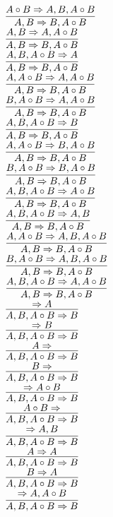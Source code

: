 \documentclass[11pt]{article}
\begin{document}
\begin{center}
\bigskip
\\$\infer{A, B\Rightarrow B, A\circ B}{A\circ B\Rightarrow A, B, A\circ B}$
\bigskip
\\$\infer{A, B\Rightarrow B, A\circ B}{A, B\Rightarrow A, A\circ B}$
\bigskip
\\$\infer{A, B\Rightarrow B, A\circ B}{A, B, A\circ B\Rightarrow A}$
\bigskip
\\$\infer{A, B\Rightarrow B, A\circ B}{A, A\circ B\Rightarrow A, A\circ B}$
\bigskip
\\$\infer{A, B\Rightarrow B, A\circ B}{B, A\circ B\Rightarrow A, A\circ B}$
\bigskip
\\$\infer{A, B\Rightarrow B, A\circ B}{A, B, A\circ B\Rightarrow B}$
\bigskip
\\$\infer{A, B\Rightarrow B, A\circ B}{A, A\circ B\Rightarrow B, A\circ B}$
\bigskip
\\$\infer{A, B\Rightarrow B, A\circ B}{B, A\circ B\Rightarrow B, A\circ B}$
\bigskip
\\$\infer{A, B\Rightarrow B, A\circ B}{A, B, A\circ B\Rightarrow A\circ B}$
\bigskip
\\$\infer{A, B\Rightarrow B, A\circ B}{A, B, A\circ B\Rightarrow A, B}$
\bigskip
\\$\infer{A, B\Rightarrow B, A\circ B}{A, A\circ B\Rightarrow A, B, A\circ B}$
\bigskip
\\$\infer{A, B\Rightarrow B, A\circ B}{B, A\circ B\Rightarrow A, B, A\circ B}$
\bigskip
\\$\infer{A, B\Rightarrow B, A\circ B}{A, B, A\circ B\Rightarrow A, A\circ B}$
\bigskip
\\$\infer{A, B, A\circ B\Rightarrow B}{\Rightarrow A}$
\bigskip
\\$\infer{A, B, A\circ B\Rightarrow B}{\Rightarrow B}$
\bigskip
\\$\infer{A, B, A\circ B\Rightarrow B}{A\Rightarrow }$
\bigskip
\\$\infer{A, B, A\circ B\Rightarrow B}{B\Rightarrow }$
\bigskip
\\$\infer{A, B, A\circ B\Rightarrow B}{\Rightarrow A\circ B}$
\bigskip
\\$\infer{A, B, A\circ B\Rightarrow B}{A\circ B\Rightarrow }$
\bigskip
\\$\infer{A, B, A\circ B\Rightarrow B}{\Rightarrow A, B}$
\bigskip
\\$\infer{A, B, A\circ B\Rightarrow B}{A\Rightarrow A}$
\bigskip
\\$\infer{A, B, A\circ B\Rightarrow B}{B\Rightarrow A}$
\bigskip
\\$\infer{A, B, A\circ B\Rightarrow B}{\Rightarrow A, A\circ B}$

\end{center}
\end{document}
